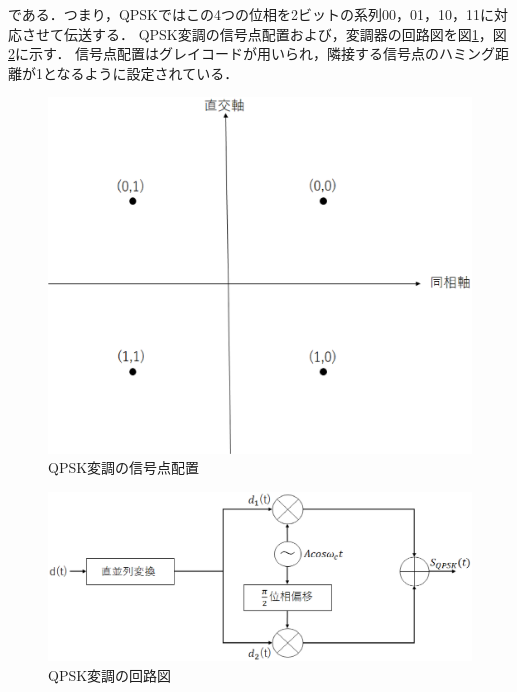 である．つまり，QPSKではこの4つの位相を2ビットの系列00，01，10，11に対応させて伝送する．
QPSK変調の信号点配置および，変調器の回路図を図\ref{fig:qpskIQ}，図\ref{fig:qpskmod}に示す．
信号点配置はグレイコードが用いられ，隣接する信号点のハミング距離が1となるように設定されている．
\begin{figure}[h]
  \begin{center}
    \includegraphics[width=0.6\linewidth]{chapter2/figure/QPSKIQ.eps}
    \caption{QPSK変調の信号点配置}
    \label{fig:qpskIQ}
  \end{center}
\end{figure}
\begin{figure}[h]
  \begin{center}
    \includegraphics[width=0.8\linewidth]{chapter2/figure/QPSKshift.eps}
    \caption{QPSK変調の回路図}
    \label{fig:qpskmod}
  \end{center}
\end{figure}

